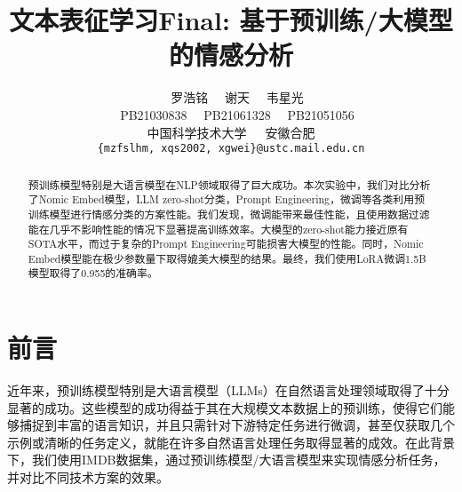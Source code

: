 \documentclass{article}
\title{文本表征学习Final: 基于预训练/大模型的情感分析}
\author{
~~{\large 罗浩铭\quad}
~~{\large 谢天\quad}
~~{\large 韦星光\quad}\\
~~{PB21030838}
~~{PB21061328}
~~{PB21051056}\\
中国科学技术大学\ \ \ 安徽合肥\\
{\tt \{mzfslhm, xqs2002, xgwei\}@ustc.mail.edu.cn} \\
}
\begin{document}
\maketitle




\begin{abstract}
  预训练模型特别是大语言模型在NLP领域取得了巨大成功。本次实验中，我们对比分析了Nomic Embed模型，LLM zero-shot分类，Prompt Engineering，微调等各类利用预训练模型进行情感分类的方案性能。我们发现，微调能带来最佳性能，且使用数据过滤能在几乎不影响性能的情况下显著提高训练效率。大模型的zero-shot能力接近原有SOTA水平，而过于复杂的Prompt Engineering可能损害大模型的性能。同时，Nomic Embed模型能在极少参数量下取得媲美大模型的结果。最终，我们使用LoRA微调1.5B模型取得了0.955的准确率。
\end{abstract}

\section{前言}
近年来，预训练模型特别是大语言模型（LLMs）在自然语言处理领域取得了十分显著的成功。这些模型的成功得益于其在大规模文本数据上的预训练，使得它们能够捕捉到丰富的语言知识，并且只需针对下游特定任务进行微调，甚至仅获取几个示例或清晰的任务定义，就能在许多自然语言处理任务取得显著的成效。在此背景下，我们使用IMDB数据集，通过预训练模型/大语言模型来实现情感分析任务，并对比不同技术方案的效果。
\end{document}
